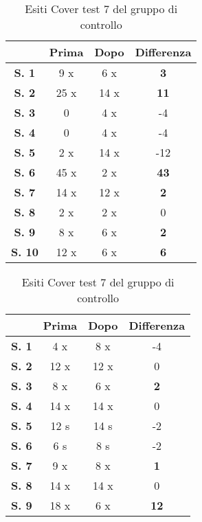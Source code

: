 \begin{table}[H]
\centering
\setlength\tabcolsep{4pt}
\begin{minipage}{0.48\textwidth}
\centering

\begin{tabular}{|c|c|c|c|} \hline
{\textbf{}} & {\textbf{Prima}} & {\textbf{Dopo}}& {\textbf{Differenza}} \\ \hline
\textbf{S. 1} & 9 x & 6 x & \textbf{3} \\ \hline
\textbf{S. 2} & 25 x & 14 x & \textbf{11} \\ \hline
\textbf{S. 3} & 0 & 4 x & -4 \\ \hline
\textbf{S. 4} & 0 & 4 x & -4 \\ \hline
\textbf{S. 5} & 2 x & 14 x & -12 \\ \hline
\textbf{S. 6} & 45 x & 2 x & \textbf{43} \\ \hline
\textbf{S. 7} & 14 x & 12 x & \textbf{2} \\ \hline
\textbf{S. 8} & 2 x & 2 x & 0 \\ \hline
\textbf{S. 9} & 8 x & 6 x & \textbf{2} \\ \hline
\textbf{S. 10} & 12 x & 6 x & \textbf{6} \\ \hline
\end{tabular} 
\caption{Esiti Cover test 7 del gruppo sperimentale}

\label{tab:accuracy} 
\end{minipage}%
\hfill
\begin{minipage}{0.48\textwidth}
\centering

\begin{tabular}{|c|c|c|c|} \hline
{\textbf{}} & {\textbf{Prima}} & {\textbf{Dopo}}& {\textbf{Differenza}} \\ \hline
\textbf{S. 1} & 4 x & 8 x & -4 \\ \hline
\textbf{S. 2} & 12 x & 12 x & 0 \\ \hline
\textbf{S. 3} & 8 x & 6 x & \textbf{2} \\ \hline
\textbf{S. 4} & 14 x & 14 x & 0 \\ \hline
\textbf{S. 5} & 12 s & 14 s & -2 \\ \hline
\textbf{S. 6} & 6 s  & 8 s  & -2 \\ \hline
\textbf{S. 7} & 9 x & 8 x & \textbf{1} \\ \hline
\textbf{S. 8} & 14 x & 14 x & 0 \\ \hline
\textbf{S. 9} & 18 x & 6 x & \textbf{12} \\ \hline
\end{tabular} 
\caption{Esiti Cover test 7 del gruppo di controllo}

 \label{tab:ompdiff} 
\end{minipage}
\end{table}
